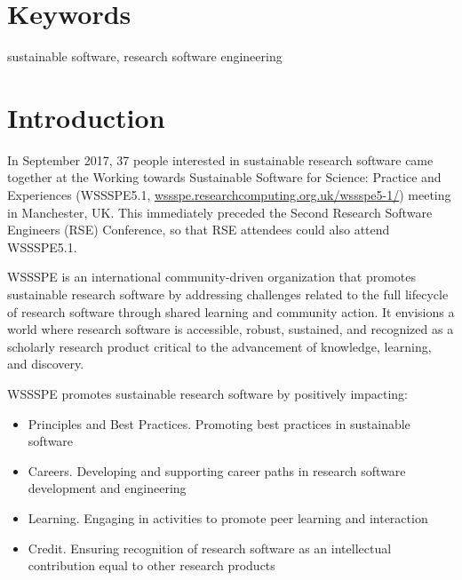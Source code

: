 \documentclass[11pt,letterpaper]{article}
\newcommand{\sdnote}[1]{ {\textcolor{darkgreen}    { ***Stephan: #1 }}}
\begin{document}
\section*{Keywords}

sustainable software, research software engineering

\clearpage


\section{Introduction} \label{sec:intro}


In September 2017, 37 people interested in sustainable research software came together at the Working towards Sustainable Software for Science: Practice and Experiences (WSSSPE5.1, \href{http://wssspe.researchcomputing.org.uk/wssspe5-1/}{wssspe.researchcomputing.org.uk/wssspe5-1/}) meeting in Manchester, UK. This immediately preceded the Second Research Software Engineers (RSE) Conference, so that RSE attendees could also attend WSSSPE5.1.






 WSSSPE is an international community-driven organization that promotes sustainable research software by addressing challenges related to the full lifecycle of research software through shared learning and community action.
%
 It envisions a world where research software is accessible, robust, sustained, and recognized as a scholarly research product critical to the advancement of knowledge, learning, and discovery.

 WSSSPE promotes sustainable research software by positively impacting:
 \begin{itemize}
 \item Principles and Best Practices. Promoting best practices in sustainable software
 \item Careers. Developing and supporting career paths in research software development and engineering
 \item Learning. Engaging in activities to promote peer learning and interaction
 \item Credit. Ensuring recognition of research software as an intellectual contribution equal to other research products
 \end{itemize}
\end{document}
